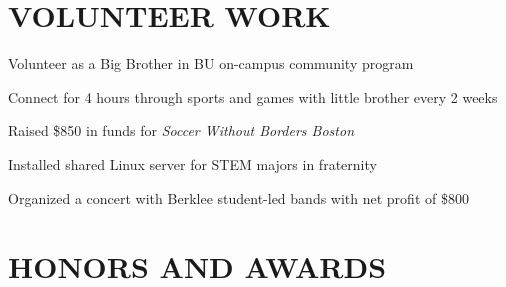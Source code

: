\documentclass[10pt]{article}
\begin{document}
\begin{FlushLeft}
  \section{VOLUNTEER WORK}

  \begin{itemize}{
    \item Volunteer as a Big Brother in BU on-campus community program
    \item Connect for 4 hours through sports and games with little brother every 2 weeks
    }
  \end{itemize}

  
  \begin{itemize}{
      
    \item Raised \$850 in funds for \textit{Soccer Without Borders Boston}
    }
  \end{itemize}
  
  \begin{itemize}{
    \item Installed shared Linux server for STEM majors in fraternity
    \item Organized a concert with Berklee student-led bands with net profit of \$800
    }
  \end{itemize}

  
  \section{HONORS AND AWARDS}
  \vspace{-0.75em}
  \begin{itemize}{
    \item {}
    }
  \end{itemize}

\end{FlushLeft}
\end{document}

